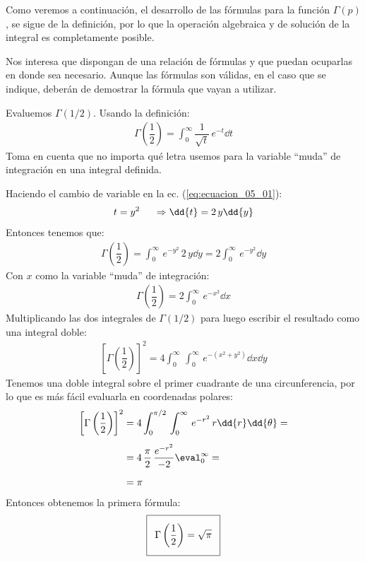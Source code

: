 Como veremos a continuación, el desarrollo de las fórmulas para la función $\Gamma (p)$, se sigue de la definición, por lo que la operación algebraica y de solución de la integral es completamente posible.
\par
Nos interesa que dispongan de una relación de fórmulas y que puedan ocuparlas en donde sea necesario. Aunque las fórmulas son válidas, en el caso que se indique, deberán de demostrar la fórmula que vayan a utilizar.
\par 
Evaluemos $\Gamma (1/2)$. Usando la definición:
\begin{align}
\Gamma \left( \dfrac{1}{2}\right) = \int_{0}^{\infty} \dfrac{1}{\sqrt{t}} \, e^{-t} \dd{t}
\label{eq:ecuacion_05_01}
\end{align}
Toma en cuenta que no importa qué letra usemos para la variable \enquote{muda} de integración en una integral definida.
\par
Haciendo el cambio de variable en la ec. (\ref{eq:ecuacion_05_01}):
\begin{align*}
t = y^{2} \hspace{0.5cm} \Rightarrow \dd{t} = 2 \, y \dd{y}
\end{align*}
Entonces tenemos que:
\begin{align*}
\Gamma \left( \dfrac{1}{2} \right) = \int_{0}^{\infty} \, e^{-y^{2}} \, 2 \, y \dd{y} = 2 \int_{0}^{\infty} \, e^{-y^{2}} \dd{y}
\end{align*}
Con $x$ como la variable \enquote{muda} de integración:
\begin{align}
\Gamma \left( \dfrac{1}{2} \right) = 2 \int_{0}^{\infty} \, e^{-x^{2}} \dd{x}
\label{eq:ecuacion_05_02}
\end{align}
Multiplicando las dos integrales de $\Gamma (1/2)$ para luego escribir el resultado como una integral doble:
\begin{align*}
\left[ \Gamma \left( \dfrac{1}{2} \right) \right]^{2} = 4 \int_{0}^{\infty} \, \int_{0}^{\infty} \, e^{-(x^{2} + y^{2})} \dd{x} \dd{y}
\end{align*}
Tenemos una doble integral sobre el primer cuadrante de una circunferencia, por lo que es más fácil evaluarla en coordenadas polares:
\begin{align*}
\left[ \Gamma \left( \dfrac{1}{2} \right) \right]^{2} &= 4 \int_{0}^{\pi/2} \, \int_{0}^{\infty} \, e^{-r^{2}} \, r \dd{r} \dd{\theta} = \\[0.5em]
&= 4 \, \dfrac{\pi}{2} \, \dfrac{e^{-r^{2}}}{-2}\eval_{0}^{\infty} = \\[0.5em]
&= \pi
\end{align*}
Entonces obtenemos la primera fórmula:
\begin{align}\addtolength{\fboxsep}{5pt}\boxed{
\Gamma \left( \dfrac{1}{2} \right) = \sqrt{\pi}}
\label{eq:ecuacion_05_03}
\end{align}

